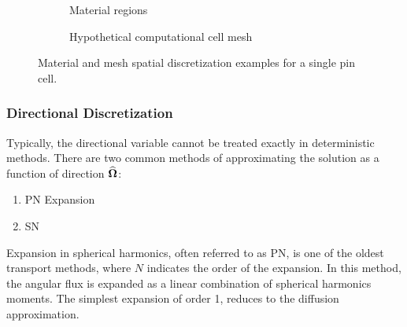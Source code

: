 {{{{                \begin{figure}[h]
                    \centering
                    \begin{subfigure}[t]{0.45\linewidth}
                        \centering
                        \def\svgwidth{\linewidth}
                        
                        \caption{Material regions}
                        \label{fig:NTT:Pin Cell Materials}
                    \end{subfigure}%
                    \hfill
                    \begin{subfigure}[t]{0.45\linewidth}
                        \centering
                        \def\svgwidth{\linewidth}
                        
                        \caption{Hypothetical computational cell mesh}
                        \label{fig:NTT:Pin Cell Mesh}
                    \end{subfigure}
                    \caption{Material and mesh spatial discretization examples for a single pin cell.}
                    \label{fig:NTT:Pin Cell}
                \end{figure}
            }
            \subsubsection{Directional Discretization}{\label{sssec:NTT:Directional Discretization}
                

                Typically, the directional variable cannot be treated exactly in deterministic methods.
                There are two common methods of approximating the solution as a function of direction $\boldsymbol{\widehat{\Omega}}$:
                \begin{enumerate}
                    \item{\ac{PN} Expansion}
                    \item{\ac{SN}}
                \end{enumerate}

                Expansion in spherical harmonics, often referred to as \acs{PN}, is one of the oldest transport methods, where $N$ indicates the order of the expansion.
                In this method, the angular flux is expanded as a linear combination of spherical harmonics moments.
                The simplest expansion of order 1, reduces to the diffusion approximation.

}}}}
